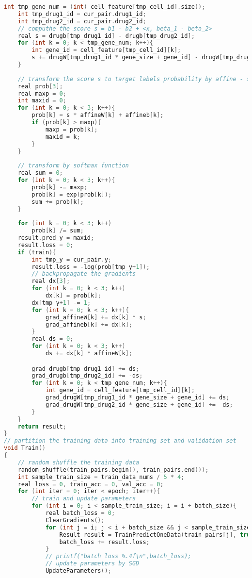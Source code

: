 \documentclass{article}
\begin{document}
\begin{lstlisting}[language=c++]
    int tmp_gene_num = (int) cell_feature[tmp_cell_id].size();
    int tmp_drug1_id = cur_pair.drug1_id;
    int tmp_drug2_id = cur_pair.drug2_id;
    // computhe the score s = b1 - b2 + <x, beta_1 - beta_2>
    real s = drugb[tmp_drug1_id] - drugb[tmp_drug2_id];
    for (int k = 0; k < tmp_gene_num; k++){
        int gene_id = cell_feature[tmp_cell_id][k];
        s += drugW[tmp_drug1_id * gene_size + gene_id] - drugW[tmp_drug2_id * gene_size + gene_id];
    }
    
    // transform the score s to target labels probability by affine - softmax layers
    real prob[3];
    real maxp = 0;
    int maxid = 0;
    for (int k = 0; k < 3; k++){
        prob[k] = s * affineW[k] + affineb[k];
        if (prob[k] > maxp){
            maxp = prob[k];
            maxid = k;
        }
    }
    
    // transform by softmax function
    real sum = 0;
    for (int k = 0; k < 3; k++){
        prob[k] -= maxp;
        prob[k] = exp(prob[k]);
        sum += prob[k];
    }
    
    for (int k = 0; k < 3; k++)
        prob[k] /= sum;
    result.pred_y = maxid;
    result.loss = 0;
    if (train){
        int tmp_y = cur_pair.y;
        result.loss = -log(prob[tmp_y+1]);
        // backpropagate the gradients
        real dx[3];
        for (int k = 0; k < 3; k++)
            dx[k] = prob[k];
        dx[tmp_y+1] -= 1;
        for (int k = 0; k < 3; k++){
            grad_affineW[k] += dx[k] * s;
            grad_affineb[k] += dx[k];
        }
        real ds = 0;
        for (int k = 0; k < 3; k++)
            ds += dx[k] * affineW[k];

        grad_drugb[tmp_drug1_id] += ds;
        grad_drugb[tmp_drug2_id] += -ds;
        for (int k = 0; k < tmp_gene_num; k++){
            int gene_id = cell_feature[tmp_cell_id][k];
            grad_drugW[tmp_drug1_id * gene_size + gene_id] += ds;
            grad_drugW[tmp_drug2_id * gene_size + gene_id] += -ds;
        }
    }
    return result;
}
// partition the training data into training set and validation set
void Train()
{
    // random shuffle the training data
    random_shuffle(train_pairs.begin(), train_pairs.end());
    int sample_train_size = train_data_nums / 5 * 4;
    real loss = 0, train_acc = 0, val_acc = 0;
    for (int iter = 0; iter < epoch; iter++){
        // train and update parameters
        for (int i = 0; i < sample_train_size; i = i + batch_size){
            real batch_loss = 0;
            ClearGradients();
            for (int j = i; j < i + batch_size && j < sample_train_size; j++){
                Result result = TrainPredictOneData(train_pairs[j], true);
                batch_loss += result.loss;
            }
            // printf("batch loss %.4f\n",batch_loss);
            // update parameters by SGD
            UpdateParameters();
            

\end{lstlisting}
\end{document}

